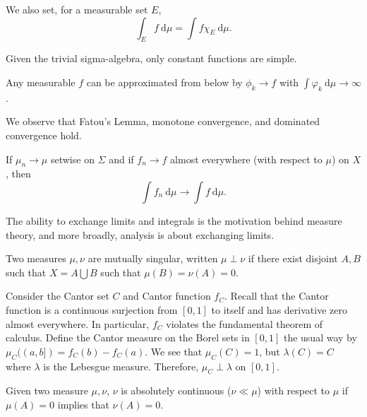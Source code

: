 \documentclass[10pt, twoside]{article}
\renewcommand{\d}{\ \mathrm{d}}
\begin{document}
    We also set, for a measurable set $E$, \[\int_{E} f\ \mathrm{d}\mu = \int
    f\chi_{E}\ \mathrm{d}\mu. \]

    \begin{exm} Given the trivial sigma-algebra, only constant functions are
    simple.  \end{exm}

    \begin{lem} Any measurable $f$ can be approximated from below by $\phi_k
    \rightarrow f$ with $\int \varphi_k\ \mathrm{d}\mu \rightarrow \infty$.
\end{lem}

    We observe that Fatou's Lemma, monotone convergence, and dominated
    convergence hold.

    \begin{lem} If $\mu_n \rightarrow \mu$ setwise on
        $\Sigma$ and if $f_n \rightarrow f$ almost everywhere (with respect to
        $\mu$) on $X$, then \[\int f_n \d \mu \rightarrow \int f \d \mu.\]
    \end{lem}

    The ability to exchange limits and integrals is the motivation behind
    measure theory, and more broadly, analysis is about exchanging limits.

    \begin{defn} Two measures $\mu, \nu$ are mutually
    singular, written $\mu \perp \nu$ if there exist disjoint $A,B$ such that
$X = A \bigcup B$ such that $\mu(B) = \nu(A) = 0$.  \end{defn}

    \begin{exm}[Cantor] Consider the Cantor set $C$ and Cantor function $f_C$.
        Recall that the Cantor function is a continuous surjection from $[0,1]$
        to itself and has derivative zero almost everywhere. In particular,
        $f_C$ violates the fundamental theorem of calculus. Define the Cantor
        measure on the Borel sets in $[0,1]$ the usual way by $\mu_C((a,b]) =
        f_C(b) - f_C(a)$. We see that $\mu_C(C) = 1$, but $\lambda(C) = C$
        where $\lambda$ is the Lebesgue measure. Therefore, $\mu_C \perp
        \lambda$ on $[0,1]$.  \end{exm}

    \begin{defn} Given two measure $\mu, \nu$, $\nu$ is
    absolutely continuous ($\nu \ll \mu$) with respect to $\mu$ if $\mu(A) = 0$
implies that $\nu(A) = 0$.  \end{defn}
\end{document}
